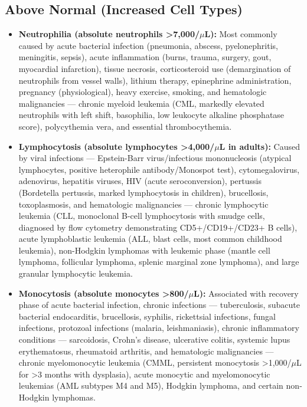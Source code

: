 \subsection*{Above Normal (Increased Cell Types)}
\begin{itemize}
  \item \textbf{Neutrophilia (absolute neutrophils >7,000/$\mu$L):} Most commonly caused by acute bacterial infection (pneumonia, abscess, pyelonephritis, meningitis, sepsis), acute inflammation (burns, trauma, surgery, gout, myocardial infarction), tissue necrosis, corticosteroid use (demargination of neutrophils from vessel walls), lithium therapy, epinephrine administration, pregnancy (physiological), heavy exercise, smoking, and hematologic malignancies --- chronic myeloid leukemia (CML, markedly elevated neutrophils with left shift, basophilia, low leukocyte alkaline phosphatase score), polycythemia vera, and essential thrombocythemia.
  \item \textbf{Lymphocytosis (absolute lymphocytes >4,000/$\mu$L in adults):} Caused by viral infections --- Epstein-Barr virus/infectious mononucleosis (atypical lymphocytes, positive heterophile antibody/Monospot test), cytomegalovirus, adenovirus, hepatitis viruses, HIV (acute seroconversion), pertussis (Bordetella pertussis, marked lymphocytosis in children), brucellosis, toxoplasmosis, and hematologic malignancies --- chronic lymphocytic leukemia (CLL, monoclonal B-cell lymphocytosis with smudge cells, diagnosed by flow cytometry demonstrating CD5+/CD19+/CD23+ B cells), acute lymphoblastic leukemia (ALL, blast cells, most common childhood leukemia), non-Hodgkin lymphomas with leukemic phase (mantle cell lymphoma, follicular lymphoma, splenic marginal zone lymphoma), and large granular lymphocytic leukemia.
  \item \textbf{Monocytosis (absolute monocytes >800/$\mu$L):} Associated with recovery phase of acute bacterial infection, chronic infections --- tuberculosis, subacute bacterial endocarditis, brucellosis, syphilis, rickettsial infections, fungal infections, protozoal infections (malaria, leishmaniasis), chronic inflammatory conditions --- sarcoidosis, Crohn's disease, ulcerative colitis, systemic lupus erythematosus, rheumatoid arthritis, and hematologic malignancies --- chronic myelomonocytic leukemia (CMML, persistent monocytosis >1,000/$\mu$L for >3 months with dysplasia), acute monocytic and myelomonocytic leukemias (AML subtypes M4 and M5), Hodgkin lymphoma, and certain non-Hodgkin lymphomas.

\end{itemize}
